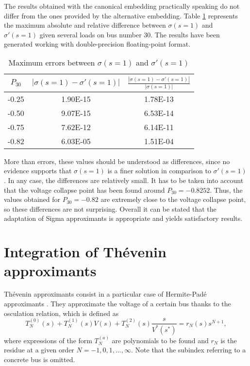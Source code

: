 \documentclass[conference]{IEEEtran}
\begin{document}
The results obtained with the canonical embedding practically speaking do not differ from the ones provided by the alternative embedding. Table \ref{tab:1} represents the maximum absolute and relative difference between $\sigma(s=1)$ and $\sigma'(s=1)$ given several loads on bus number 30. The results have been generated working with double-precision floating-point format.
\begin{table}[!ht]
\renewcommand{\arraystretch}{1.3}
\caption{Maximum errors between $\sigma(s=1)$ and $\sigma'(s=1)$}
\label{tab:1}
\centering
\begin{tabular}{ccc}
\hline
$P_{30}$ & $|\sigma(s=1)-\sigma'(s=1)|$ & $\frac{|\sigma(s=1)-\sigma'(s=1)|}{|\sigma(s=1)|}$\\
\hline
-0.25 & 1.90E-15 & 1.78E-13\\
-0.50 & 9.07E-15 & 6.53E-14\\
-0.75 & 7.62E-12 & 6.14E-11\\
-0.82 & 6.03E-05 & 1.51E-04\\
\hline
\end{tabular}
\end{table} 

More than errors, these values should be understood as differences, since no evidence supports that $\sigma(s=1)$ is a finer solution in comparison to $\sigma'(s=1)$. In any case, the differences are relatively small. It has to be taken into account that the voltage collapse point has been found around $P_{30}=-0.8252$. Thus, the values obtained for $P_{30}=-0.82$ are extremely close to the voltage collapse point, so these differences are not surprising. Overall it can be stated that the adaptation of Sigma approximants is appropriate and yields satisfactory results. 

\section{Integration of Thévenin approximants} \label{sec4}
Thévenin approximants consist in a particular case of Hermite-Padé approximants \cite{Trias2018}. They approximate the voltage of a certain bus thanks to the osculation relation, which is defined as
\begin{equation}
  T^{(0)}_N(s)+T^{(1)}_N(s)V(s)+T^{(2)}_N(s)\frac{s}{V^*(s^*)} = r_N(s)s^{N+1},
  \label{t1}
\end{equation}
where expressions of the form $T^{(a)}_N$ are polynomials to be found and $r_N$ is the residue at a given order $N=-1,0,1,...,\infty$. Note that the subindex referring to a concrete bus is omitted. 
\end{document}
